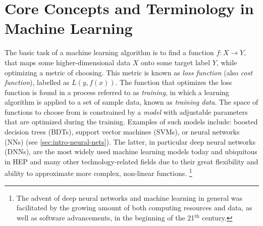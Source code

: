 

\section{Core Concepts and Terminology in Machine Learning}
The basic task of a machine learning algorithm is to find a function $f: X \rightarrow Y$, that maps some higher-dimensional data $X$ onto some target label $Y$, while optimizing a metric of choosing.
This metric is known as \emph{loss function} (also \emph{cost function}), labelled as $L(y, f(x))$.
The function that optimizes the loss function is found in a process referred to as \emph{training}, in which a learning algorithm is applied to a set of sample data, known as \emph{training data}.
The space of functions to choose from is constrained by a \emph{model} with adjustable parameters that are optimized during the training. Examples of such models include: boosted decision trees (BDTs), support vector machines (SVMs), or neural networks (NNs) (see \cref{sec:intro-neural-nets}). The latter, in particular deep neural networks (DNNs), are the most widely used machine learning models today and ubiquitous in HEP and many other technology-related fields due to their great flexibility and ability to approximate more complex, non-linear functions.  \footnote{The advent of deep neural networks and machine learning in general was facilitated by the growing amount of both computing resources and data, as well as software advancements, in the beginning of the 21$^{\text{th}}$ century.}

